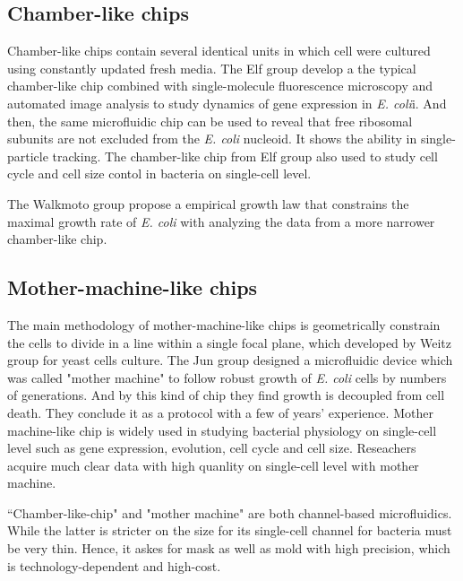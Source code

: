 \documentclass[fleqn,10pt]{wlscirep}
\begin{document}
\subsection[]{Chamber-like chips}
Chamber-like chips contain several identical units in which cell were cultured using constantly updated fresh media. The Elf group develop a the typical chamber-like chip combined with single-molecule fluorescence microscopy and automated image analysis to study dynamics of gene expression in \textit{E. coli}i\cite{Ullman2013}. And then, the same microfluidic chip can be used to reveal that free ribosomal subunits are not excluded from the \textit{E. coli} nucleoid\cite{Sanamrad2014}. It shows the ability in single-particle tracking. The chamber-like chip from Elf group also used to study cell cycle and cell size contol in bacteria on single-cell level\cite{Campos2014,Wallden2016}. 

The Walkmoto group propose a empirical growth law that constrains the maximal growth rate of \textit{E. coli} with analyzing the data from a more narrower chamber-like chip\cite{Hashimoto2016}. 

\subsection[]{Mother-machine-like chips}
The main methodology of mother-machine-like chips is geometrically constrain the cells to divide in a line within a single focal plane, which developed by Weitz group for yeast cells culture\cite{Rowat2009}. The Jun group designed a microfluidic device which was called "mother machine" to follow robust growth of \textit{E. coli} cells by numbers of generations. And by this kind of chip they find growth is decoupled from cell death\cite{Wang2010}. They conclude it as a protocol with a few of years' experience\cite{Taheri-Araghi2016}. Mother machine-like chip is widely used in studying bacterial physiology on single-cell level such as gene expression\cite{Young2012,Tanouchi2015}, evolution\cite{VanHouten2018}, cell cycle\cite{Norman2013,Marco2014} and cell size\cite{Tanouchi2015,Taheri-Araghi2015,Sauls2016}. Reseachers acquire much clear data with high quanlity on single-cell level with mother machine\cite{Tanouchi2017}. 

“Chamber-like-chip" and "mother machine" are both channel-based microfluidics. While the latter is stricter on the size for its single-cell channel for bacteria must be very thin. Hence, it askes for mask as well as mold with high precision, which is technology-dependent and high-cost.
\end{document}
